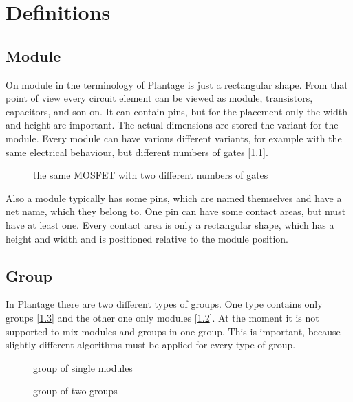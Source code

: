 \chapter{Definitions}

\section{Module}
On module in the terminology of Plantage is just a rectangular shape. From that point of view every circuit element can be viewed as module, transistors, capacitors, and son on. It can contain pins, but for the placement only the width and height are important. The actual dimensions are stored the variant for the module. Every module can have various different variants, for example with the same electrical behaviour, but different numbers of gates [\ref{fig:modules_with_different_gate_number}].

\begin{figure}
	\centering
	
	\caption{the same MOSFET with two different numbers of gates}
	\label{fig:modules_with_different_gate_number}
\end{figure}

Also a module typically has some pins, which are named themselves and have a net name, which they belong to. One pin can have some contact areas, but must have at least one. Every contact area is only a rectangular shape, which has a height and width and is positioned relative to the module position.

\section{Group}
In Plantage there are two different types of groups. One type contains only groups [\ref{fig:group_of_groups}] and the other one only modules [\ref{fig:group_of_modules}]. At the moment it is not supported to mix modules and groups in one group. This is important, because slightly different algorithms must be applied for every type of group.

\begin{figure}
	\centering
	
	\caption{group of single modules}
	\label{fig:group_of_modules}
\end{figure}

\begin{figure}
	\centering
	
	\caption{group of two groups}
	\label{fig:group_of_groups}
\end{figure}

